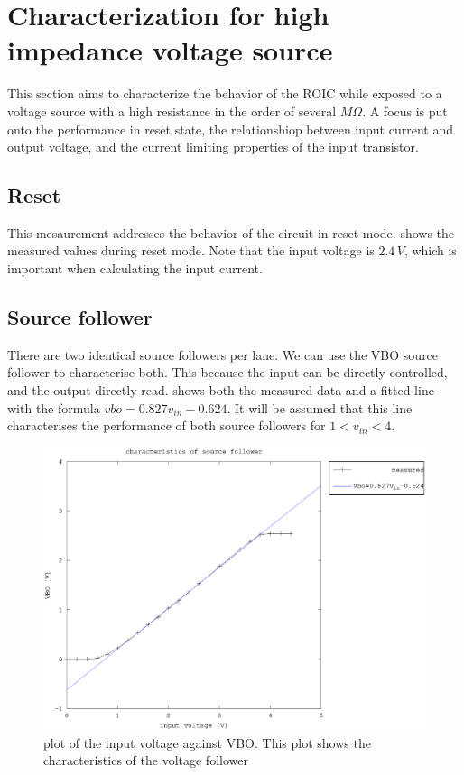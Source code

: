 \section{Characterization for high impedance voltage source}
This section aims to characterize the behavior of the ROIC while exposed to a voltage source with a high resistance in the order of several $M\Omega$. A focus is put onto the performance in reset state, the relationshiop between input current and output voltage, and the current limiting properties of the input transistor.

\subsection{Reset}
This mesaurement addresses the behavior of the circuit in reset mode.  shows the measured values during reset mode. Note that the input voltage is $2.4\,V$, which is important when calculating the input current. 




\subsection{Source follower}
There are two identical source followers per lane. We can use the VBO source follower to characterise both. This because the input can be directly controlled, and the output directly read.  shows both the measured data and a fitted line with the formula $vbo=0.827v_{in}-0.624$. It will be assumed that this line characterises the performance of both source followers for $1<v_{in}<4$.

\begin{figure}[h]
	    \centering
	    \includegraphics[width=\textwidth]{fig/source_follower.eps}
	    \caption[]%
	    {plot of the input voltage against VBO. This plot shows the characteristics of the voltage follower}    
	    \label{fig:source_follower}	
\end{figure}






